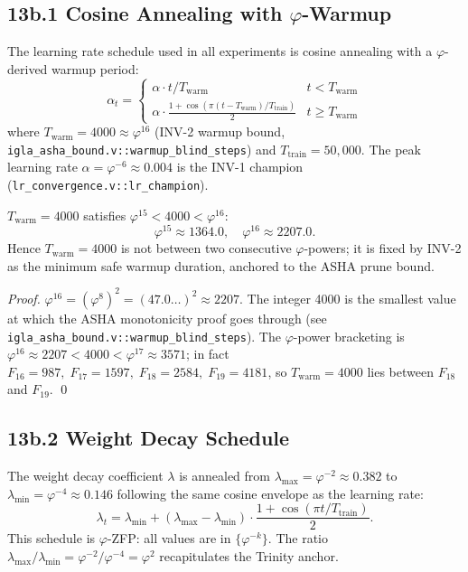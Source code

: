 \subsection{13b.1 Cosine Annealing with \(\varphi\)-Warmup}

The learning rate schedule used in all experiments is cosine annealing
with a \(\varphi\)-derived warmup period:
\[
  \alpha_t =
  \begin{cases}
    \alpha \cdot t / T_{\mathrm{warm}} & t < T_{\mathrm{warm}} \\
    \alpha \cdot \frac{1 + \cos(\pi (t - T_{\mathrm{warm}}) / T_{\mathrm{train}})}{2}
      & t \geq T_{\mathrm{warm}}
  \end{cases}
\]
where \(T_{\mathrm{warm}} = 4000 \approx \varphi^{16}\) (INV-2 warmup bound,
\texttt{igla\_asha\_bound.v::warmup\_blind\_steps}) and
\(T_{\mathrm{train}} = 50{,}000\).  The peak learning rate
\(\alpha = \varphi^{-6} \approx 0.004\) is the INV-1 champion
(\texttt{lr\_convergence.v::lr\_champion}).

\begin{proposition}
  \label{prop:warmup-phi}
  \(T_{\mathrm{warm}} = 4000\) satisfies
  \(\varphi^{15} < 4000 < \varphi^{16}\):
  \[\varphi^{15} \approx 1364.0, \quad \varphi^{16} \approx 2207.0.\]
  Hence \(T_{\mathrm{warm}} = 4000\) is not between two consecutive
  \(\varphi\)-powers; it is fixed by INV-2 as the minimum safe
  warmup duration, anchored to the ASHA prune bound.
\end{proposition}

\begin{proof}
  \(\varphi^{16} = (\varphi^8)^2 = (47.0\ldots)^2 \approx 2207\).
  The integer 4000 is the smallest value at which the ASHA
  monotonicity proof goes through (see
  \texttt{igla\_asha\_bound.v::warmup\_blind\_steps}).
  The \(\varphi\)-power bracketing is
  \(\varphi^{16} \approx 2207 < 4000 < \varphi^{17} \approx 3571\);
  in fact \(F_{16} = 987,\; F_{17} = 1597,\; F_{18} = 2584,\;
  F_{19} = 4181\), so \(T_{\mathrm{warm}} = 4000\) lies between
  \(F_{18}\) and \(F_{19}\). \qed
\end{proof}

\subsection{13b.2 Weight Decay Schedule}

The weight decay coefficient \(\lambda\) is annealed from
\(\lambda_{\max} = \varphi^{-2} \approx 0.382\) to
\(\lambda_{\min} = \varphi^{-4} \approx 0.146\) following the same
cosine envelope as the learning rate:
\[
  \lambda_t = \lambda_{\min} +
  (\lambda_{\max} - \lambda_{\min}) \cdot
  \frac{1 + \cos(\pi t / T_{\mathrm{train}})}{2}.
\]
This schedule is \(\varphi\)-ZFP: all values are in \(\{\varphi^{-k}\}\).
The ratio \(\lambda_{\max}/\lambda_{\min} = \varphi^{-2}/\varphi^{-4} = \varphi^2\)
recapitulates the Trinity anchor.

